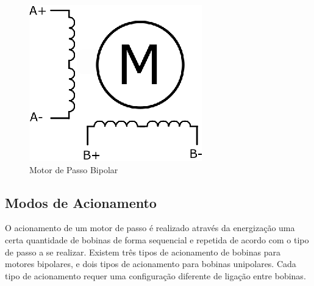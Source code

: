 \begin{figure}[H]
	\centering
	\includegraphics[width = 0.3\columnwidth]{images/MotorDePassoBipolar.eps}
	\caption{Motor de Passo Bipolar}
	\label{fig:MotorDePassoBipolar}
\end{figure}


\subsection{Modos de Acionamento} 

O acionamento de um motor de passo é realizado através da energização uma certa quantidade de bobinas de forma sequencial e repetida de acordo com o tipo de passo a se realizar. Existem três tipos de acionamento de bobinas para motores bipolares, e dois tipos de acionamento para bobinas unipolares. Cada tipo de acionamento requer uma configuração diferente de ligação entre bobinas.

